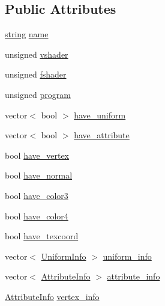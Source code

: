 \subsection*{Public Attributes}
\begin{DoxyCompactItemize}
\item 
\hyperlink{namespacetrimesh_a51b4a31323874089623d4b17afabc1aa}{string} \hyperlink{classtrimesh_1_1GLManager_1_1ShaderInfo_a3fc10768cdc649b181979cfef7d8f989}{name}
\item 
unsigned \hyperlink{classtrimesh_1_1GLManager_1_1ShaderInfo_adfbd24cd9991b9e186a445173b0ee674}{vshader}
\item 
unsigned \hyperlink{classtrimesh_1_1GLManager_1_1ShaderInfo_aa443c1b6134c6d4e5aaa1f018cf7e082}{fshader}
\item 
unsigned \hyperlink{classtrimesh_1_1GLManager_1_1ShaderInfo_a629301935610a8fdedfe0df51e5afa98}{program}
\item 
vector$<$ bool $>$ \hyperlink{classtrimesh_1_1GLManager_1_1ShaderInfo_af49ea2f4c844c265563a042cef631e6a}{have\+\_\+uniform}
\item 
vector$<$ bool $>$ \hyperlink{classtrimesh_1_1GLManager_1_1ShaderInfo_af7b281e45ac7d97b590bc20ca698257e}{have\+\_\+attribute}
\item 
bool \hyperlink{classtrimesh_1_1GLManager_1_1ShaderInfo_a10741bbbc291833622bd2694001d51ce}{have\+\_\+vertex}
\item 
bool \hyperlink{classtrimesh_1_1GLManager_1_1ShaderInfo_a3b190a6af7fdbb61533494233b5e0c2a}{have\+\_\+normal}
\item 
bool \hyperlink{classtrimesh_1_1GLManager_1_1ShaderInfo_ae4ace1a2442025249e9998edf15c2e91}{have\+\_\+color3}
\item 
bool \hyperlink{classtrimesh_1_1GLManager_1_1ShaderInfo_abf29493514c982e62d8d96482c85bcd5}{have\+\_\+color4}
\item 
bool \hyperlink{classtrimesh_1_1GLManager_1_1ShaderInfo_a17bc641438ea6274f09f431a3c1e9043}{have\+\_\+texcoord}
\item 
vector$<$ \hyperlink{structtrimesh_1_1GLManager_1_1UniformInfo}{Uniform\+Info} $>$ \hyperlink{classtrimesh_1_1GLManager_1_1ShaderInfo_a920bfaade65f472e48419d75676e2777}{uniform\+\_\+info}
\item 
vector$<$ \hyperlink{structtrimesh_1_1GLManager_1_1AttributeInfo}{Attribute\+Info} $>$ \hyperlink{classtrimesh_1_1GLManager_1_1ShaderInfo_ad4e74b92640b391cb1bf670406082f55}{attribute\+\_\+info}
\item 
\hyperlink{structtrimesh_1_1GLManager_1_1AttributeInfo}{Attribute\+Info} \hyperlink{classtrimesh_1_1GLManager_1_1ShaderInfo_a33d64ee205d1331960af5cac553c3142}{vertex\+\_\+info}

\end{DoxyCompactItemize}
